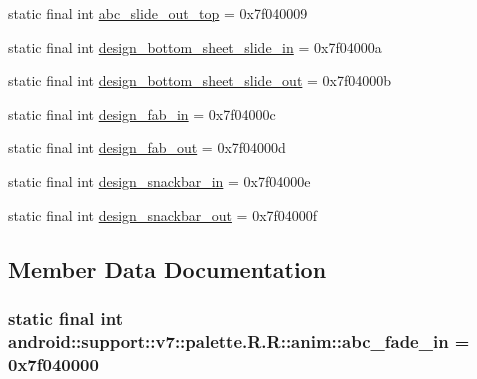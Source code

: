 \begin{CompactItemize}
static final int \hyperlink{classandroid_1_1support_1_1v7_1_1palette_1_1_r_1_1anim_063aa7473782e4ecbc272fd83429fcfe}{abc\_\-slide\_\-out\_\-top} = 0x7f040009
\item 
static final int \hyperlink{classandroid_1_1support_1_1v7_1_1palette_1_1_r_1_1anim_2406c26d071978a6e9583a3a0fb435a7}{design\_\-bottom\_\-sheet\_\-slide\_\-in} = 0x7f04000a
\item 
static final int \hyperlink{classandroid_1_1support_1_1v7_1_1palette_1_1_r_1_1anim_3f5106abae43420c45343730f41cf9b6}{design\_\-bottom\_\-sheet\_\-slide\_\-out} = 0x7f04000b
\item 
static final int \hyperlink{classandroid_1_1support_1_1v7_1_1palette_1_1_r_1_1anim_e3463e67c7c0f2c2e1e012097b94daf0}{design\_\-fab\_\-in} = 0x7f04000c
\item 
static final int \hyperlink{classandroid_1_1support_1_1v7_1_1palette_1_1_r_1_1anim_fa1feed5e05c0a4b9255cafec3f1909b}{design\_\-fab\_\-out} = 0x7f04000d
\item 
static final int \hyperlink{classandroid_1_1support_1_1v7_1_1palette_1_1_r_1_1anim_0d5c5a3594a5a4127ba6ccc2437d5829}{design\_\-snackbar\_\-in} = 0x7f04000e
\item 
static final int \hyperlink{classandroid_1_1support_1_1v7_1_1palette_1_1_r_1_1anim_ac2616ccd82a1eb6a7b263edd90ba96c}{design\_\-snackbar\_\-out} = 0x7f04000f
\end{CompactItemize}


\subsection{Member Data Documentation}
\hypertarget{classandroid_1_1support_1_1v7_1_1palette_1_1_r_1_1anim_e8d10554b17af6d24a695cb1c49879f4}{
\subsubsection[{abc\_\-fade\_\-in}]{\setlength{\rightskip}{0pt plus 5cm}static final int android::support::v7::palette.R.R::anim::abc\_\-fade\_\-in = 0x7f040000}}
\label{classandroid_1_1support_1_1v7_1_1palette_1_1_r_1_1anim_e8d10554b17af6d24a695cb1c49879f4}


